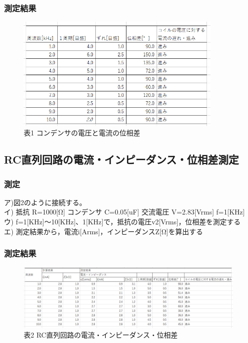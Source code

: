 \documentclass[titlepage]{jarticle}
\begin{document}
\subsubsection{測定結果}
\begin{figure}[H]
    \begin{center}
        \caption{表1 コンデンサの電圧と電流の位相差}
        \includegraphics[width=10cm]{image/sp1.png}
    \end{center}
\end{figure}

\subsection{RC直列回路の電流・インピーダンス・位相差測定}
\subsubsection{測定}
\begin{flushleft}
    ア)図2のように接続する。\\
    イ) 抵抗 R=1000[Ω] コンデンサ C=0.05[uF] 交流電圧 V=2.83[Vrms] f=1[KHz]\\
    ウ) f=1[KHz]～10[KHz]、1[KHz]で，抵抗の電圧v2[Vrms]，位相差を測定する\\
    エ) 測定結果から，電流i[Arms]，インピーダンスZ[Ω]を算出する\\
\end{flushleft}

\subsubsection{測定結果}
\begin{figure}[H]
    \begin{center}
        \caption{表2 RC直列回路の電流・インピーダンス・位相差}
        \includegraphics[width=17cm]{image/sp2.png}
    \end{center}
\end{figure}
\end{document}
